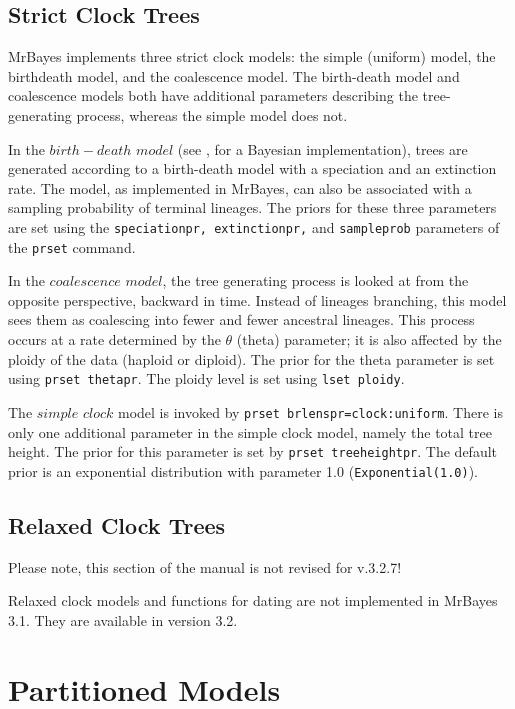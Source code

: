\documentclass[12pt]{book}
\newcommand{\ttt}[1]{\texttt{#1}}
\begin{document}
\subsection{Strict Clock Trees}

MrBayes implements three strict clock models: the simple (uniform) model, the birthdeath model, and
the coalescence model. The birth-death model and coalescence models both have additional parameters
describing the tree-generating process, whereas the simple model does not.

In the $birth-death$ $model$ (see \citet{yang97b}, for a Bayesian implementation), trees are
generated according to a birth-death model with a speciation and an extinction rate. The model, as
implemented in MrBayes, can also be associated with a sampling probability of terminal lineages.
The priors for these three parameters are set using the \ttt{speciationpr, extinctionpr,} and
\ttt{sampleprob} parameters of the \ttt{prset} command.

In the $coalescence$ $model$, the tree generating process is looked at from the opposite
perspective, backward in time. Instead of lineages branching, this model sees them as coalescing
into fewer and fewer ancestral lineages. This process occurs at a rate determined by the $\theta$
(theta) parameter; it is also affected by the ploidy of the data (haploid or diploid). The prior
for the theta parameter is set using \ttt{prset thetapr}. The ploidy level is set using \ttt{lset
ploidy}.

The $simple$ $clock$ model is invoked by \ttt{prset brlenspr=clock:uniform}. There is only one
additional parameter in the simple clock model, namely the total tree height. The prior for this
parameter is set by \ttt{prset treeheightpr}. The default prior is an exponential distribution with
parameter 1.0 (\ttt{Exponential(1.0)}).

\subsection{Relaxed Clock Trees}
{\large\color{red} Please note, this section of the manual is not revised for v.3.2.7!}

Relaxed clock models and functions for dating are not implemented in MrBayes 3.1. They are
available in version 3.2.

\section{Partitioned Models}
\label{partitionedModels}
\end{document}
